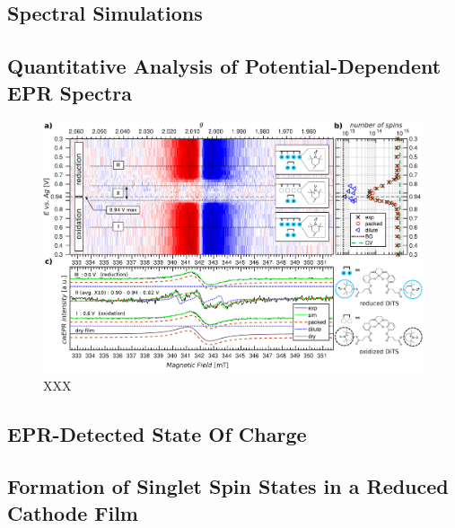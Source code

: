 \subsection{Spectral Simulations}

\subsection{Quantitative Analysis of Potential-Dependent EPR Spectra}
\label{sec:quantitative_EPR}
\begin{figure}[h]
\center
	\includegraphics[width=1\textwidth]{./operando_epr/figures/Main_2D_redox_map_full.pdf}
	\caption{XXX}
	\label{fig:operando_carpet}
\end{figure}
\subsection{EPR-Detected State Of Charge}

\subsection{Formation of Singlet Spin States in a Reduced Cathode Film}

